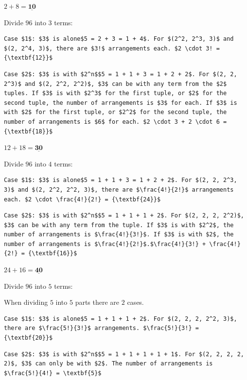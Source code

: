 \begin{enumerate}
$2 + 8 = \underline{\textbf{10}}$

 
Divide $96$ into $3$ terms:

 \begin{verbatim}
Case $1$: $3$ is alone$5 = 2 + 3 = 1 + 4$. For $(2^2, 2^3, 3)$ and $(2, 2^4, 3)$, there are $3!$ arrangements each. $2 \cdot 3! = {\textbf{12}}$
\end{verbatim}

\begin{verbatim}
Case $2$: $3$ is with $2^n$$5 = 1 + 1 + 3 = 1 + 2 + 2$. For $(2, 2, 2^3)$ and $(2, 2^2, 2^2)$, $3$ can be with any term from the $2$ tuples. If $3$ is with $2^3$ for the first tuple, or $2$ for the second tuple, the number of arrangements is $3$ for each. If $3$ is with $2$ for the first tuple, or $2^2$ for the second tuple, the number of arrangements is $6$ for each. $2 \cdot 3 + 2 \cdot 6 = {\textbf{18}}$
\end{verbatim}

$12 + 18 = \underline{\textbf{30}}$

 
Divide $96$ into $4$ terms:

 \begin{verbatim}
Case $1$: $3$ is alone$5 = 1 + 1 + 3 = 1 + 2 + 2$. For $(2, 2, 2^3, 3)$ and $(2, 2^2, 2^2, 3)$, there are $\frac{4!}{2!}$ arrangements each. $2 \cdot \frac{4!}{2!} = {\textbf{24}}$
\end{verbatim}

\begin{verbatim}
Case $2$: $3$ is with $2^n$$5 = 1 + 1 + 1 + 2$. For $(2, 2, 2, 2^2)$, $3$ can be with any term from the tuple. If $3$ is with $2^2$, the number of arrangements is $\frac{4!}{3!}$. If $3$ is with $2$, the number of arrangements is $\frac{4!}{2!}$.$\frac{4!}{3!} + \frac{4!}{2!} = {\textbf{16}}$
\end{verbatim}

$24 + 16 = \underline{\textbf{40}}$

 
Divide $96$ into $5$ terms:

 When dividing $5$ into $5$ parts there are $2$ cases.

 \begin{verbatim}
Case $1$: $3$ is alone$5 = 1 + 1 + 1 + 2$. For $(2, 2, 2, 2^2, 3)$, there are $\frac{5!}{3!}$ arrangements. $\frac{5!}{3!} = {\textbf{20}}$
\end{verbatim}

\begin{verbatim}
Case $2$: $3$ is with $2^n$$5 = 1 + 1 + 1 + 1 + 1$. For $(2, 2, 2, 2, 2)$, $3$ can only be with $2$. The number of arrangements is $\frac{5!}{4!} = \textbf{5}$
\end{verbatim}


\end{enumerate}
